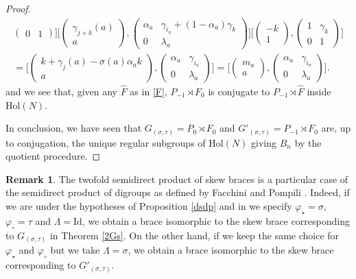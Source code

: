 \documentclass[12pt]{article}
\theoremstyle{definition}
\newtheorem{remark}[theorem]{Remark}
\newcommand{\Hol}{\mathrm{Hol}}
\begin{document}
\begin{proof}
$$\begin{array}{l}
\begin{pmatrix}
		0&1
		\end{pmatrix}\Big]\Big[\begin{pmatrix}
		\gamma_{j+k}(a)\\
		a
		\end{pmatrix},\begin{pmatrix}
		\alpha_a & \gamma_{i_a}+(1-\alpha_a)\gamma_k\\
		0&\lambda_a
		\end{pmatrix}\Big]
\Big[\begin{pmatrix}
		-k\\
		1
		\end{pmatrix},\begin{pmatrix}
		1 & \gamma_k\\
		0&1
		\end{pmatrix}\Big]\\[12pt]
=\Big[\begin{pmatrix}
		k+\gamma_j(a)-\sigma(a)\alpha_a k\\
		a
		\end{pmatrix},\begin{pmatrix}
	\alpha_a & \gamma_{i_a}\\
		0&\lambda_a
		\end{pmatrix}\Big]
=\Big[\begin{pmatrix}
		m_a\\
		a
		\end{pmatrix},\begin{pmatrix}
	\alpha_a & \gamma_{i_a}\\
		0&\lambda_a
		\end{pmatrix}\Big].
        \end{array}
		$$
and we see that, given any $\hat F$ as in \eqref{F},  $P_{-1}\rtimes F_0$ is conjugate to $P_{-1}\rtimes \hat F$ inside $\Hol(N)$.

In conclusion, we have seen that $G_{(\sigma,\tau)}=P_0\rtimes F_0$ and $G'_{(\sigma,\tau)}=P_{-1}\rtimes F_0$ are, up to conjugation, the unique regular subgroups of $\Hol(N)$ giving $B_n$ by the quotient procedure.
\end{proof}


	\begin{remark} The twofold semidirect product of skew braces is a particular case of the semidirect product of digroups as defined by Facchini and Pompili \cite{FP}. Indeed, if we are under the hypotheses of Proposition \ref{dsdp} and in \cite[Proposition 4.2]{FP} we specify $\varphi_{\star}=\sigma$, $\varphi_{\circ}=\tau$ and $\Lambda=\mathrm{Id}$, we obtain a brace isomorphic to the skew brace corresponding to $G_{(\sigma,\tau)}$ in Theorem \ref{2Gs}. On the other hand, if we keep the same choice for $\varphi_{\star}$ and $\varphi_{\circ}$ but we take $\Lambda=\sigma$, we obtain a brace isomorphic to the skew brace corresponding to $G'_{(\sigma,\tau)}$. 
	\end{remark}
	
\end{document}
